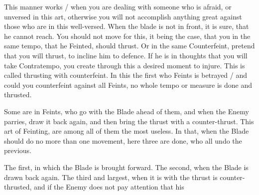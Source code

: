 
This manner works / when you are dealing with someone who is afraid,
or unversed in this art, otherwise you will not accomplish anything
great against those who are in this well-versed. When the blade is
not in front, it is sure, that he cannot reach. You should not move
for this, it being the case, that you in the same tempo, that he
Feinted, should thrust. Or in the same Counterfeint, pretend that you
will thrust, to incline him to defence. If he is in thoughts that you
will take Contratempo, you create through this a desired moment to
injure. This is called thrusting with counterfeint. In this the first
who Feints is betrayed / and could you counterfeint against all
Feints, no whole tempo or measure is done and thrusted.


Some are in Feints, who go with the Blade ahead of them, and when the
Enemy parries, draw it back again, and then bring the thrust with a
counter-thrust. This art of Feinting, are among all of them the most
useless. In that, when the Blade should do no more than one movement,
here three are done, who all undo the previous.


The first, in which the Blade is brought forward. The second, when the
Blade is drawn back again. The third and largest, when it is with the
thrust is counter-thrusted, and if the Enemy does not
pay attention that his
